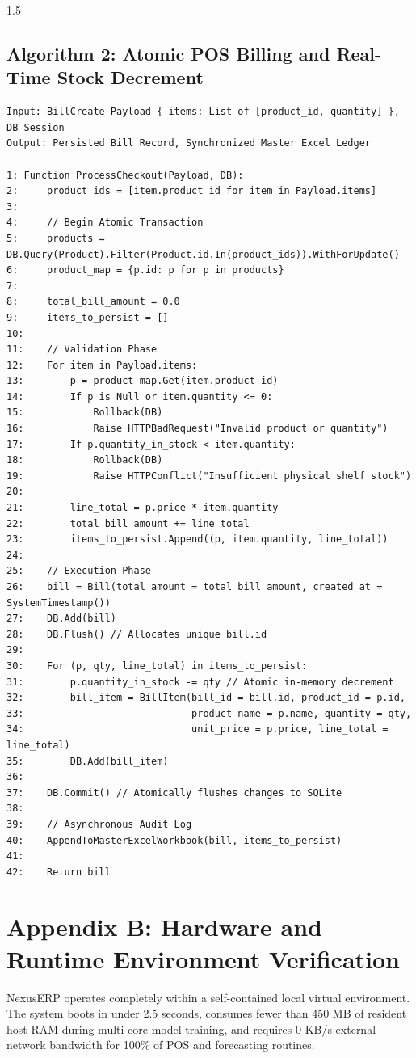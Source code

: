 \begin{spacing}{1.5}
\vspace{1cm}
\subsection*{Algorithm 2: Atomic POS Billing and Real-Time Stock Decrement}
\begin{verbatim}
Input: BillCreate Payload { items: List of [product_id, quantity] }, DB Session
Output: Persisted Bill Record, Synchronized Master Excel Ledger

1: Function ProcessCheckout(Payload, DB):
2:     product_ids = [item.product_id for item in Payload.items]
3:     
4:     // Begin Atomic Transaction
5:     products = DB.Query(Product).Filter(Product.id.In(product_ids)).WithForUpdate()
6:     product_map = {p.id: p for p in products}
7:     
8:     total_bill_amount = 0.0
9:     items_to_persist = []
10:    
11:    // Validation Phase
12:    For item in Payload.items:
13:        p = product_map.Get(item.product_id)
14:        If p is Null or item.quantity <= 0:
15:            Rollback(DB)
16:            Raise HTTPBadRequest("Invalid product or quantity")
17:        If p.quantity_in_stock < item.quantity:
18:            Rollback(DB)
19:            Raise HTTPConflict("Insufficient physical shelf stock")
20:            
21:        line_total = p.price * item.quantity
22:        total_bill_amount += line_total
23:        items_to_persist.Append((p, item.quantity, line_total))
24:        
25:    // Execution Phase
26:    bill = Bill(total_amount = total_bill_amount, created_at = SystemTimestamp())
27:    DB.Add(bill)
28:    DB.Flush() // Allocates unique bill.id
29:    
30:    For (p, qty, line_total) in items_to_persist:
31:        p.quantity_in_stock -= qty // Atomic in-memory decrement
32:        bill_item = BillItem(bill_id = bill.id, product_id = p.id,
33:                             product_name = p.name, quantity = qty,
34:                             unit_price = p.price, line_total = line_total)
35:        DB.Add(bill_item)
36:        
37:    DB.Commit() // Atomically flushes changes to SQLite
38:    
39:    // Asynchronous Audit Log
40:    AppendToMasterExcelWorkbook(bill, items_to_persist)
41:    
42:    Return bill
\end{verbatim}

\section*{Appendix B: Hardware and Runtime Environment Verification}
NexusERP operates completely within a self-contained local virtual environment. The system boots in under 2.5 seconds, consumes fewer than 450 MB of resident host RAM during multi-core model training, and requires 0 KB/s external network bandwidth for 100\% of POS and forecasting routines.

\end{spacing}
